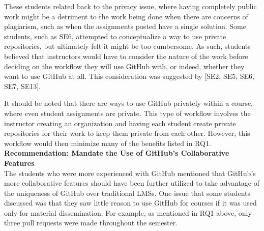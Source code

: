
These students related back to the privacy issue, where having completely public work might be a detriment to the work being done when there are concerns of plagiarism, such as when the assignments posted have a single solution. Some students, such as SE6, attempted to conceptualize a way to use private repositories, but ultimately felt it might be too cumbersome. As such, students believed that instructors would have to consider the nature of the work before deciding on the workflow they will use GitHub with, or indeed, whether they want to use GitHub at all. This consideration was suggested by [SE2, SE5, SE6, SE7, SE13].

It should be noted that there are ways to use GitHub privately within a course, where even student assignments are private. This type of workflow involves the instructor creating an organization and having each student create private repositories for their work to keep them private from each other. However, this workflow would then minimize many of the benefits listed in RQ1. \\


\textbf{Recommendation: Mandate the Use of GitHub's Collaborative Features} \\
The students who were more experienced with GitHub mentioned that GitHub's more collaborative features should have been further utilized to take advantage of the uniqueness of GitHub over traditional LMSs. One issue that some students discussed was that they saw little reason to use GitHub for courses if it was used only for material dissemination. For example, as mentioned in RQ1 above, only three pull requests were made throughout the semester.

